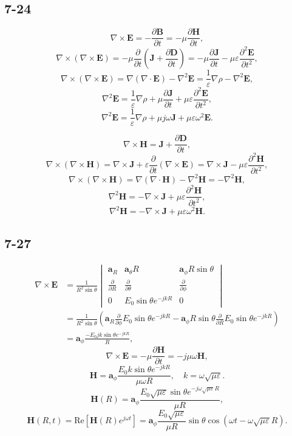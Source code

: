 \documentclass[11pt,a4paper]{article}
\author{\href{liuyh615@sjtu.edu.cn}{Yihao Liu} (515370910207)}
\subtitle{Homework}
\begin{document}
\maketitle

\subsection{7-24}
$$\nabla\times\mathbf{E}=-\frac{\partial\mathbf{B}}{\partial t}=-\mu\frac{\partial\mathbf{H}}{\partial t},$$
$$\nabla\times(\nabla\times\mathbf{E})=-\mu\frac{\partial}{\partial t}\left(\mathbf{J}+\frac{\partial\mathbf{D}}{\partial t}\right)=-\mu\frac{\partial\mathbf{J}}{\partial t}-\mu\varepsilon\frac{\partial^2\mathbf{E}}{\partial t^2},$$
$$\nabla\times(\nabla\times\mathbf{E})=\nabla(\nabla\cdot\mathbf{E})-\nabla^2\mathbf{E}=\frac{1}{\varepsilon}\nabla\rho-\nabla^2\mathbf{E},$$
$$\nabla^2\mathbf{E}=\frac{1}{\varepsilon}\nabla\rho+\mu\frac{\partial\mathbf{J}}{\partial t}+\mu\varepsilon\frac{\partial^2\mathbf{E}}{\partial t^2},$$
$$\nabla^2\mathbf{E}=\frac{1}{\varepsilon}\nabla\rho+\mu j\omega\mathbf{J}+\mu\varepsilon\omega^2\mathbf{E}.$$

$$\nabla\times\mathbf{H}=\mathbf{J}+\frac{\partial\mathbf{D}}{\partial t},$$
$$\nabla\times(\nabla\times\mathbf{H})=\nabla\times\mathbf{J}+\varepsilon\frac{\partial}{\partial t}(\nabla\times\mathbf{E})=\nabla\times\mathbf{J}-\mu\varepsilon\frac{\partial^2\mathbf{H}}{\partial t^2},$$
$$\nabla\times(\nabla\times\mathbf{H})=\nabla(\nabla\cdot\mathbf{H})-\nabla^2\mathbf{H}=-\nabla^2\mathbf{H},$$
$$\nabla^2\mathbf{H}=-\nabla\times\mathbf{J}+\mu\varepsilon\frac{\partial^2\mathbf{H}}{\partial t^2},$$
$$\nabla^2\mathbf{H}=-\nabla\times\mathbf{J}+\mu\varepsilon\omega^2\mathbf{H}.$$

\subsection{7-27}
\begin{align*}
\nabla\times\mathbf{E}&=\frac{1}{R^2\sin\theta}\begin{vmatrix}
\mathbf{a}_R & \mathbf{a}_\theta R & \mathbf{a}_\phi R\sin\theta \\
\frac{\partial}{\partial R} & \frac{\partial}{\partial\theta} & \frac{\partial}{\partial\phi} \\
0 & E_0\sin\theta e^{-jkR} & 0 \end{vmatrix}\\
&=\frac{1}{R^2\sin\theta}\left(\mathbf{a}_R\frac{\partial}{\partial\phi}E_0\sin\theta e^{-jkR}-\mathbf{a}_\phi R\sin\theta\frac{\partial}{\partial R}E_0\sin\theta e^{-jkR}\right)\\
&=\mathbf{a}_\phi\frac{-E_0jk\sin\theta e^{-jkR}}{R},
\end{align*}
$$\nabla\times\mathbf{E} = -\mu\frac{\partial\mathbf{H}}{\partial t}=-j\mu\omega\mathbf{H},$$
$$\mathbf{H}=\mathbf{a}_\phi\frac{E_0k\sin\theta e^{-jkR}}{\mu\omega R},\quad k=\omega\sqrt{\mu\varepsilon}.$$
$$\mathbf{H}(R)=\mathbf{a}_\phi\frac{E_0\sqrt{\mu\varepsilon}\sin\theta e^{-j\omega\sqrt{\mu\varepsilon}R}}{\mu R},$$
$$\mathbf{H}(R,t)=\text{Re}[\mathbf{H}(R)e^{j\omega t}]=\mathbf{a}_\phi\frac{E_0\sqrt{\mu\varepsilon}}{\mu R}\sin\theta\cos(\omega t-\omega\sqrt{\mu\varepsilon}R).$$
\end{document}
